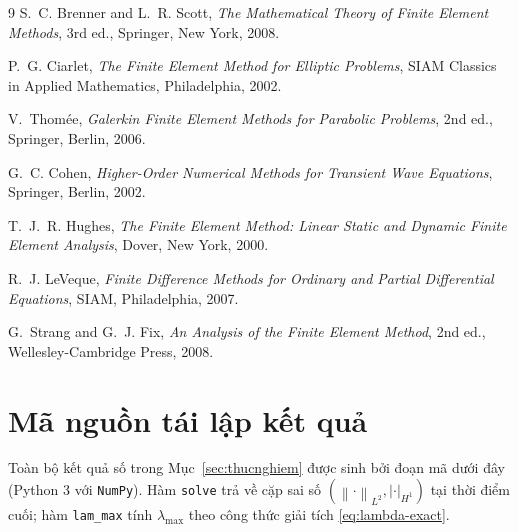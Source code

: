 \documentclass[11pt,a4paper]{article}
\theoremstyle{plain}
\theoremstyle{definition}
\theoremstyle{remark}
\newcommand{\Hone}{H^{1}}
\newcommand{\Ltwo}{L^{2}}
\newcommand{\norm}[1]{\left\lVert #1 \right\rVert}
\newcommand{\seminorm}[1]{\left\lvert #1 \right\rvert}
\newcommand{\lammax}{\lambda_{\max}}
\begin{document}
\begin{thebibliography}{9}
S.~C. Brenner and L.~R. Scott,
\emph{The Mathematical Theory of Finite Element Methods},
3rd ed., Springer, New York, 2008.

P.~G. Ciarlet,
\emph{The Finite Element Method for Elliptic Problems},
SIAM Classics in Applied Mathematics, Philadelphia, 2002.

V.~Thomée,
\emph{Galerkin Finite Element Methods for Parabolic Problems},
2nd ed., Springer, Berlin, 2006.

G.~C. Cohen,
\emph{Higher-Order Numerical Methods for Transient Wave Equations},
Springer, Berlin, 2002.

T.~J.~R. Hughes,
\emph{The Finite Element Method: Linear Static and Dynamic Finite Element
Analysis}, Dover, New York, 2000.

R.~J. LeVeque,
\emph{Finite Difference Methods for Ordinary and Partial Differential
Equations}, SIAM, Philadelphia, 2007.

G.~Strang and G.~J. Fix,
\emph{An Analysis of the Finite Element Method},
2nd ed., Wellesley-Cambridge Press, 2008.
\end{thebibliography}

\appendix
\section{Mã nguồn tái lập kết quả}
\label{app:code}

Toàn bộ kết quả số trong Mục~\ref{sec:thucnghiem} được sinh bởi đoạn mã dưới
đây (Python 3 với \texttt{NumPy}). Hàm \texttt{solve} trả về cặp sai số
$(\norm{\cdot}_{\Ltwo}, \seminorm{\cdot}_{\Hone})$ tại thời điểm cuối; hàm
\texttt{lam\_max} tính $\lammax$ theo công thức giải tích
\eqref{eq:lambda-exact}.


\end{document}
